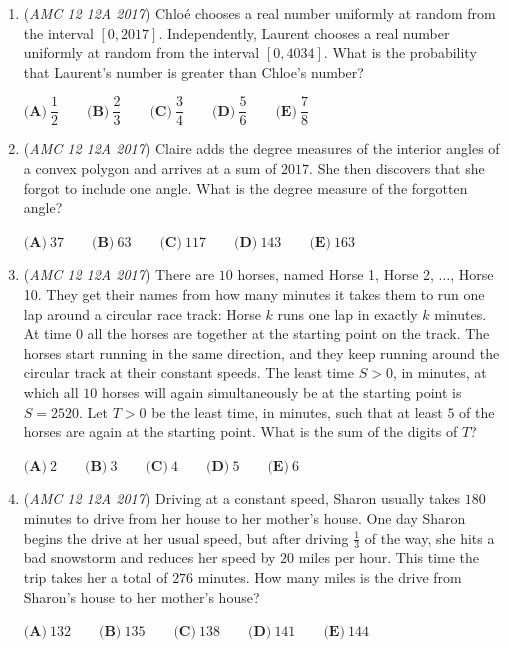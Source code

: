 \begin{enumerate}
	\item (\textit{AMC 12 12A 2017}) Chloé chooses a real number uniformly at random from the interval $[ 0,2017 ]$. Independently, Laurent chooses a real number uniformly at random from the interval $[ 0 , 4034 ]$. What is the probability that Laurent's number is greater than Chloe's number?  


 $\textbf{(A)}\ \dfrac{1}{2} \qquad\textbf{(B)}\ \dfrac{2}{3} \qquad\textbf{(C)}\ \dfrac{3}{4} \qquad\textbf{(D)}\ \dfrac{5}{6} \qquad\textbf{(E)}\ \dfrac{7}{8}$


	\item (\textit{AMC 12 12A 2017}) Claire adds the degree measures of the interior angles of a convex polygon and arrives at a sum of $2017$. She then discovers that she forgot to include one angle. What is the degree measure of the forgotten angle?


 $\textbf{(A)}\ 37\qquad\textbf{(B)}\ 63\qquad\textbf{(C)}\ 117\qquad\textbf{(D)}\ 143\qquad\textbf{(E)}\ 163$


	\item (\textit{AMC 12 12A 2017}) There are $10$ horses, named Horse 1, Horse 2, $\ldots$, Horse 10. They get their names from how many minutes it takes them to run one lap around a circular race track: Horse $k$ runs one lap in exactly $k$ minutes. At time 0 all the horses are together at the starting point on the track. The horses start running in the same direction, and they keep running around the circular track at their constant speeds. The least time $S > 0$, in minutes, at which all $10$ horses will again simultaneously be at the starting point is $S = 2520$. Let  $T>0$ be the least time, in minutes, such that at least $5$ of the horses are again at the starting point. What is the sum of the digits of  $T$?


 $\textbf{(A)}\ 2\qquad\textbf{(B)}\ 3\qquad\textbf{(C)}\ 4\qquad\textbf{(D)}\ 5\qquad\textbf{(E)}\ 6$


	\item (\textit{AMC 12 12A 2017}) Driving at a constant speed, Sharon usually takes $180$ minutes to drive from her house to her mother's house. One day Sharon begins the drive at her usual speed, but after driving $\frac{1}{3}$ of the way, she hits a bad snowstorm and reduces her speed by $20$ miles per hour. This time the trip takes her a total of $276$ minutes. How many miles is the drive from Sharon's house to her mother's house?


 $\textbf{(A)}\ 132 \qquad\textbf{(B)}\ 135 \qquad\textbf{(C)}\ 138 \qquad\textbf{(D)}\ 141 \qquad\textbf{(E)}\ 144$



\end{enumerate}
